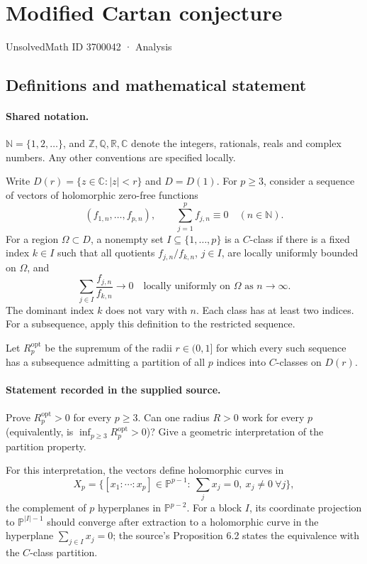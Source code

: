 \documentclass[11pt]{article}
\begin{document}
\setcounter{section}{3700041}
\section{Modified Cartan conjecture}\label{3700042}
{\small\sffamily UnsolvedMath ID 3700042 · Analysis}
\subsection{Definitions and mathematical statement}

\paragraph{Shared notation.}$\mathbb N=\{1,2,\ldots\}$, and $\mathbb Z,\mathbb Q,\mathbb R,\mathbb C$ denote the integers, rationals, reals and complex numbers. Any other conventions are specified locally.


Write $D(r)=\{z\in\mathbb C:|z|<r\}$ and $D=D(1)$. For $p\ge3$, consider a sequence of vectors of holomorphic zero-free functions
\[
 (f_{1,n},\ldots,f_{p,n}),\qquad \sum_{j=1}^{p}f_{j,n}\equiv0\quad(n\in\mathbb N).
\]
For a region $\Omega\subset D$, a nonempty set $I\subseteq\{1,\ldots,p\}$ is a $C$-class if there is a fixed index $k\in I$ such that all quotients $f_{j,n}/f_{k,n}$, $j\in I$, are locally uniformly bounded on $\Omega$, and
\[
 \sum_{j\in I}\frac{f_{j,n}}{f_{k,n}}\longrightarrow0
 \quad\text{locally uniformly on }\Omega\text{ as }n\to\infty.
\]
The dominant index $k$ does not vary with $n$. Each class has at least two indices. For a subsequence, apply this definition to the restricted sequence.

Let $R_p^{\mathrm{opt}}$ be the supremum of the radii $r\in(0,1]$ for which every such sequence has a subsequence admitting a partition of all $p$ indices into $C$-classes on $D(r)$.
\paragraph{Statement recorded in the supplied source.}
Prove $R_p^{\mathrm{opt}}>0$ for every $p\ge3$. Can one radius $R>0$ work for every $p$ (equivalently, is $\inf_{p\ge3}R_p^{\mathrm{opt}}>0$)? Give a geometric interpretation of the partition property.

For this interpretation, the vectors define holomorphic curves in
\[
 X_p=\{[x_1:\cdots:x_p]\in\mathbb P^{p-1}:\ \sum_jx_j=0,\ x_j\ne0\ \forall j\},
\]
the complement of $p$ hyperplanes in $\mathbb P^{p-2}$. For a block $I$, its coordinate projection to $\mathbb P^{|I|-1}$ should converge after extraction to a holomorphic curve in the hyperplane $\sum_{j\in I}x_j=0$; the source's Proposition 6.2 states the equivalence with the $C$-class partition.
\end{document}
